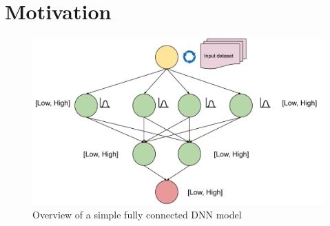 \section{Motivation}
\label{sec:motivation}
\begin{figure}
	\includegraphics[width=\linewidth]{overview}
	\caption{Overview of a simple fully connected DNN model}
	\label{fig:rq5}
\end{figure}
